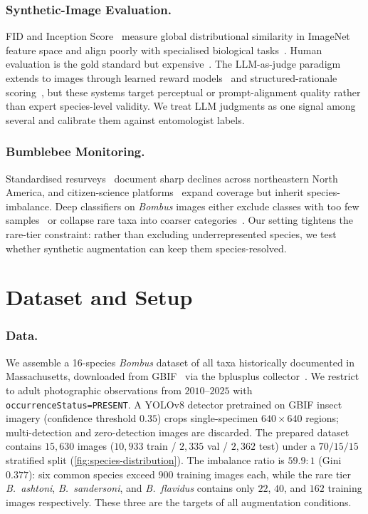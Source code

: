 \documentclass[runningheads]{llncs}
\begin{document}
\subsubsection{Synthetic-Image Evaluation.}
FID and Inception Score~\cite{salimans_improved_2016, heusel_gans_2018}
measure global distributional similarity in ImageNet feature space and
align poorly with specialised biological
tasks~\cite{borji_pros_2021, jayasumana_rethinking_2024}. Human
evaluation is the gold standard but
expensive~\cite{otani_toward_2023}. The LLM-as-judge
paradigm~\cite{zheng_judging_2023} extends to images through learned
reward models~\cite{xu_imagereward_2023} and structured-rationale
scoring~\cite{lu_llmscore_2023}, but these systems target perceptual or
prompt-alignment quality rather than expert species-level validity. We
treat LLM judgments as one signal among several and calibrate them
against entomologist labels.

\subsubsection{Bumblebee Monitoring.}
Standardised resurveys~\cite{cameron_patterns_2011,
jacobson_decline_2018, richardson_bumble_2019} document sharp declines
across northeastern North America, and citizen-science
platforms~\cite{macphail_bumble_2024} expand coverage but inherit
species-imbalance. Deep classifiers on \emph{Bombus} images either
exclude classes with too few samples~\cite{spiesman_assessing_2021} or
collapse rare taxa into coarser
categories~\cite{bjerge_deep_2024, bjerge_hierarchical_2023}. Our
setting tightens the rare-tier constraint: rather than excluding
underrepresented species, we test whether synthetic augmentation can
keep them species-resolved.


\section{Dataset and Setup}
\label{sec:setup}

\subsubsection{Data.}
We assemble a 16-species \emph{Bombus} dataset of all taxa historically
documented in Massachusetts, downloaded from
GBIF~\cite{gbif_home_2025} via the bplusplus
collector~\cite{venverloo_towards_2024}. We restrict to adult
photographic observations from $2010$--$2025$ with
\texttt{occurrenceStatus=PRESENT}. A YOLOv8 detector pretrained on GBIF
insect imagery (confidence threshold $0.35$) crops single-specimen
$640{\times}640$ regions; multi-detection and zero-detection images are
discarded. The prepared dataset contains $15{,}630$ images
($10{,}933$ train / $2{,}335$ val / $2{,}362$ test) under a
$70/15/15$ stratified split (\cref{fig:species-distribution}). The
imbalance ratio is $59.9{:}1$ (Gini $0.377$): six common species exceed
$900$ training images each, while the rare tier \emph{B.~ashtoni},
\emph{B.~sandersoni}, and \emph{B.~flavidus} contains only $22$, $40$,
and $162$ training images respectively. These three are the targets of
all augmentation conditions.
\end{document}
